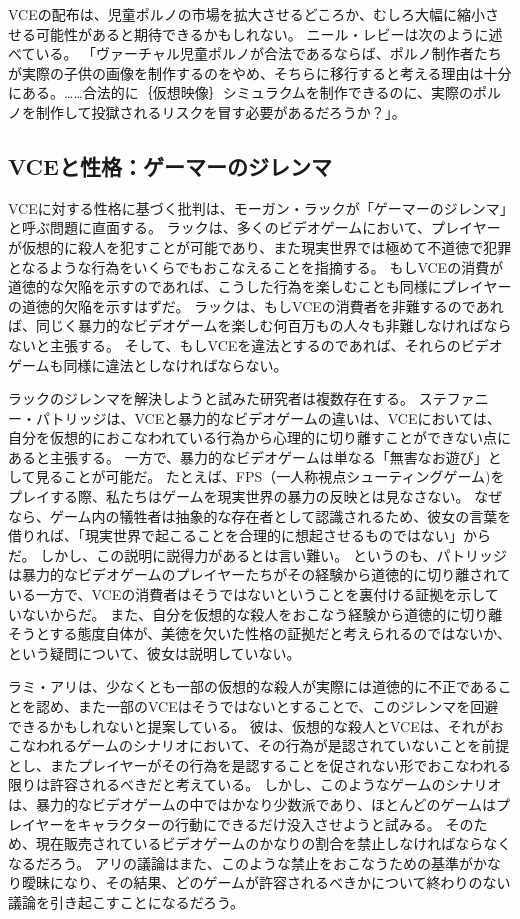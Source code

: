 \documentclass[paper=a4,book,openany]{jlreq}
\newcommand{\ig}[1]{}           %
\begin{document}
VCEの配布は、児童ポルノの市場を拡大させるどころか、むしろ大幅に縮小させる可能性があると期待できるかもしれない。
ニール・レビーは次のように述べている。
「ヴァーチャル児童ポルノが合法であるならば、ポルノ制作者たちが実際の子供の画像を制作するのをやめ、そちらに移行すると考える理由は十分にある。……合法的に｛仮想映像｝{シミュラクム}を制作できるのに、実際のポルノを制作して投獄されるリスクを冒す必要があるだろうか？」\citep[p.320]{levy02:_virtual_child_pornog}\ig{Neil Levy}。

\subsection{VCEと性格：ゲーマーのジレンマ}

VCEに対する性格に基づく批判は、モーガン・ラックが「ゲーマーのジレンマ」と呼ぶ問題に直面する。
ラックは、多くのビデオゲームにおいて、プレイヤーが仮想的に殺人を犯すことが可能であり、また現実世界では極めて不道徳で犯罪となるような行為をいくらでもおこなえることを指摘する。
もしVCEの消費が道徳的な欠陥を示すのであれば、こうした行為を楽しむことも同様にプレイヤーの道徳的欠陥を示すはずだ。
ラックは、もしVCEの消費者を非難するのであれば、同じく暴力的なビデオゲームを楽しむ何百万もの人々も非難しなければならないと主張する。
そして、もしVCEを違法とするのであれば、それらのビデオゲームも同様に違法としなければならない\citep{luck09:_gamer_dilem}。

ラックのジレンマを解決しようと試みた研究者は複数存在する。
ステファニー・パトリッジは、VCEと暴力的なビデオゲームの違いは、VCEにおいては、自分を仮想的におこなわれている行為から心理的に切り離すことができない点にあると主張する。
一方で、暴力的なビデオゲームは単なる「無害なお遊び」として見ることが可能だ。
たとえば、FPS（一人称視点シューティングゲーム)をプレイする際、私たちはゲームを現実世界の暴力の反映とは見なさない。
なぜなら、ゲーム内の犠牲者は抽象的な存在者として認識されるため、彼女の言葉を借りれば、「現実世界で起こることを合理的に想起させるものではない」からだ\citep[p.33]{patridge13:_pornog_ethic_video_games}。
しかし、この説明に説得力があるとは言い難い。
というのも、パトリッジは暴力的なビデオゲームのプレイヤーたちがその経験から道徳的に切り離されている一方で、VCEの消費者はそうではないということを裏付ける証拠を示していないからだ。
また、自分を仮想的な殺人をおこなう経験から道徳的に切り離そうとする態度自体が、美徳を欠いた性格の証拠だと考えられるのではないか、という疑問について、彼女は説明していない。

ラミ・アリは、少なくとも一部の仮想的な殺人が実際には道徳的に不正であることを認め、また一部のVCEはそうではないとすることで、このジレンマを回避できるかもしれないと提案している。
彼は、仮想的な殺人とVCEは、それがおこなわれるゲームのシナリオにおいて、その行為が是認されていないことを前提とし、またプレイヤーがその行為を是認することを促されない形でおこなわれる限りは許容されるべきだと考えている\citep{ali15:_new_solut_gamer_dilem}。
しかし、このようなゲームのシナリオは、暴力的なビデオゲームの中ではかなり少数派であり、ほとんどのゲームはプレイヤーをキャラクターの行動にできるだけ没入させようと試みる。
そのため、現在販売されているビデオゲームのかなりの割合を禁止しなければならなくなるだろう。
アリの議論はまた、このような禁止をおこなうための基準がかなり曖昧になり、その結果、どのゲームが許容されるべきかについて終わりのない議論を引き起こすことになるだろう。
\end{document}
